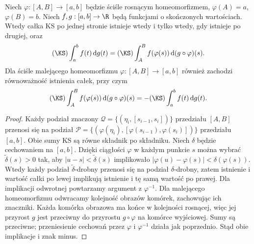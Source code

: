 \begin{twierdzenie}
\label{tw:ks-substitution}
Niech $\varphi:[A,B]\to[a,b]$ będzie ściśle rosnącym homeomorfizmem, $\varphi(A)=a$, $\varphi(B)=b$. Niech $f,g:[a,b]\to\R$ będą funkcjami o skończonych wartościach. Wtedy całka KS po jednej stronie istnieje wtedy i tylko wtedy, gdy istnieje po drugiej, oraz
\[
 (\KS)\int_a^b f(t)\,\mathrm dg(t)
 =(\KS)\int_A^B f(\varphi(s))\,\mathrm d(g\circ\varphi)(s).
\]
Dla ściśle malejącego homeomorfizmu $\varphi:[A,B]\to[a,b]$ również zachodzi równoważność istnienia całek, przy czym
\[
 (\KS)\int_A^B f(\varphi(s))\,\mathrm d(g\circ\varphi)(s)
 =-(\KS)\int_a^b f(t)\,\mathrm dg(t).
\]
\end{twierdzenie}
\begin{proof}
Każdy podział znaczony $\mathcal Q=\{(\eta_i,[s_{i-1},s_i])\}$ przedziału $[A,B]$ przenosi się na podział $\mathcal P=\{(\varphi(\eta_i),[\varphi(s_{i-1}),\varphi(s_i)])\}$ przedziału $[a,b]$. Obie sumy KS są równe składnik po składniku. Niech $\delta$ będzie cechowaniem na $[a,b]$. Dzięki ciągłości $\varphi$ w każdym punkcie $s$ można wybrać $\widetilde\delta(s)>0$ tak, aby $|u-s|<\widetilde\delta(s)$ implikowało $|\varphi(u)-\varphi(s)|<\delta(\varphi(s))$. Wtedy każdy podział $\widetilde\delta$-drobny przenosi się na podział $\delta$-drobny, zatem istnienie i wartość całki po lewej implikują istnienie i tę samą wartość po prawej. Dla implikacji odwrotnej powtarzamy argument z $\varphi^{-1}$.
Dla malejącego homeomorfizmu odwracamy kolejność obrazów komórek, zachowując ich znaczniki. Każda komórka obrazowa ma końce w kolejności rosnącej, więc jej przyrost $g$ jest przeciwny do przyrostu $g\circ\varphi$ na komórce wyjściowej. Sumy są przeciwne; przeniesienie cechowań przez $\varphi$ i $\varphi^{-1}$ działa jak poprzednio. Stąd obie implikacje i znak minus.
\end{proof}

